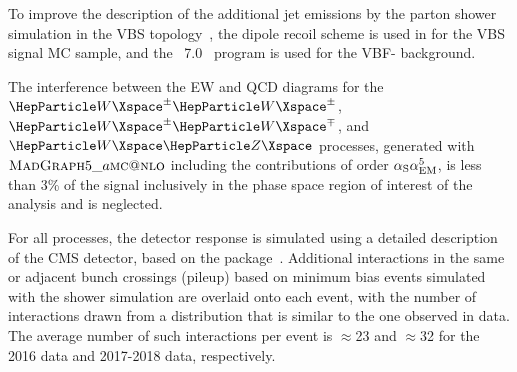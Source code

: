 To improve the description of the additional jet emissions by the parton shower simulation in the VBS
topology~\cite{covarelli_vector-boson_2021,ballestrero_precise_2018,Jager:2020hkz}, the dipole recoil scheme is used in
 \PYTHIA for the VBS signal MC sample, and the \HERWIG~7.0~\cite{Bahr:2008pv,Bellm:2015jjp}
program is used for the VBF-{\PV} background.

The interference between the EW and QCD diagrams for the $\PW^{\pm}\PW^{\pm}$, $\PW^{\pm}\PW^{\mp}$, and $\PW\PZ$
 processes, generated with $\textsc{MadGraph}{}5\_a\textsc{mc@nlo}$ including the contributions of order $\alpha_\mathrm{S}\alpha_{\mathrm{EM}}^5$, is less than
 3\% of the signal inclusively in the phase space region of interest of the analysis and is neglected.
 
For all processes, the detector response is simulated using a detailed description of the CMS detector, based on
the \GEANTfour package~\cite{Agostinelli:2002hh}.  Additional interactions in the same or adjacent bunch crossings
(pileup) based on minimum bias events simulated with the \PYTHIA
shower simulation are overlaid onto each event, with the number of
interactions drawn from a distribution that is similar to the one observed in data.  The average number of such
interactions per event is $\approx$23 and $\approx$32 for the 2016 data and 2017-2018 data, respectively.





